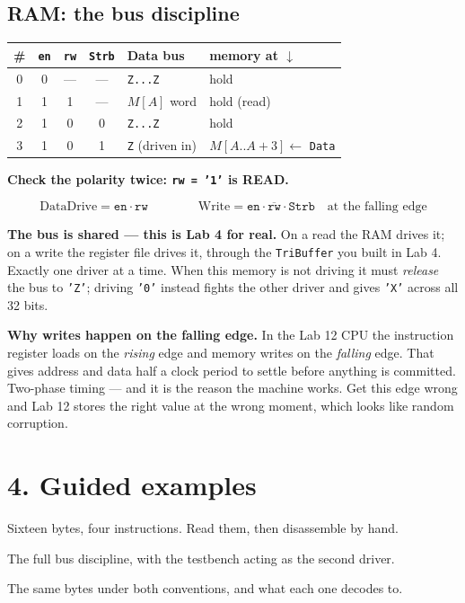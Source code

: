 \documentclass[11pt]{article}
\newcommand{\code}[1]{\texttt{#1}}
\begin{document}
\subsection*{RAM: the bus discipline}

\begin{center}
\begin{tabular}{cccc@{\hskip 8pt}||@{\hskip 8pt}ll}
\toprule
\# & \code{en} & \code{rw} & \code{Strb} & Data bus & memory at $\downarrow$ \\
\midrule
0 & 0 & --- & --- & \code{Z...Z} & hold \\
1 & 1 & 1 & --- & $M[A]$ word & hold \quad (read) \\
2 & 1 & 0 & 0 & \code{Z...Z} & hold \\
3 & 1 & 0 & 1 & \code{Z} (driven in) & $M[A..A{+}3] \leftarrow$ \code{Data} \\
\bottomrule
\end{tabular}
\end{center}

\textbf{Check the polarity twice: \code{rw = '1'} is READ.}

\[
\text{DataDrive} = \code{en} \cdot \code{rw}
\qquad\qquad
\text{Write} = \code{en} \cdot \overline{\code{rw}} \cdot \code{Strb}
\quad\text{at the falling edge}
\]

\textbf{The bus is shared --- this is Lab 4 for real.} On a read the RAM drives
it; on a write the register file drives it, through the \code{TriBuffer} you
built in Lab 4. Exactly one driver at a time. When this memory is not driving it
must \emph{release} the bus to \code{'Z'}; driving \code{'0'} instead fights the
other driver and gives \code{'X'} across all 32 bits.

\textbf{Why writes happen on the falling edge.} In the Lab 12 CPU the
instruction register loads on the \emph{rising} edge and memory writes on the
\emph{falling} edge. That gives address and data half a clock period to settle
before anything is committed. Two-phase timing --- and it is the reason the
machine works. Get this edge wrong and Lab 12 stores the right value at the
wrong moment, which looks like random corruption.

\section*{4. Guided examples}

\begin{description}[leftmargin=2.4em,style=nextline,itemsep=2pt]
\item[Example 1 --- \code{rom\_small}] Sixteen bytes, four instructions. Read
them, then disassemble by hand.
\item[Example 2 --- \code{ram\_small}] The full bus discipline, with the
testbench acting as the second driver.
\item[Example 3 --- \code{endian\_demo}] The same bytes under both conventions,
and what each one decodes to.
\end{description}
\end{document}
